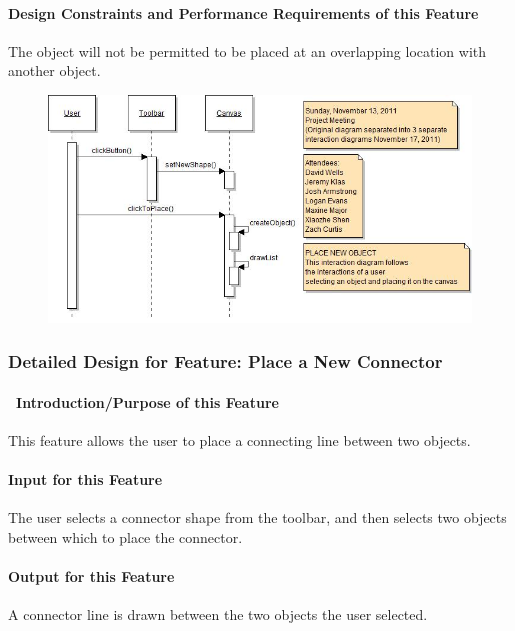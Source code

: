 \documentclass[twoside,letterpaper]{article}
\begin{document}
{\paragraph{Design Constraints and Performance Requirements of this Feature}
{\color{black}
The object will not be permitted to be placed at an overlapping location with another object.
}
\bigskip
\bigskip

\begin{figure}[h]
\centering
\includegraphics[width=6.0in]{IntNewObj.jpg}
\end{figure}

\clearpage


\subsubsection{Detailed Design for Feature: Place a New Connector}

\paragraph[\ Introduction/Purpose of this Feature]
{\ Introduction/Purpose of this Feature}
{\color{black}
This feature allows the user to place a connecting line between two objects.
}

\paragraph[Input for this Feature]{Input for this Feature}
{\color{black}
The user selects a connector shape from the toolbar, and then selects two objects between which to place the connector.
}

\paragraph{Output for this Feature}
{\color{black}
A connector line is drawn between the two objects the user selected.
}

}
\end{document}
